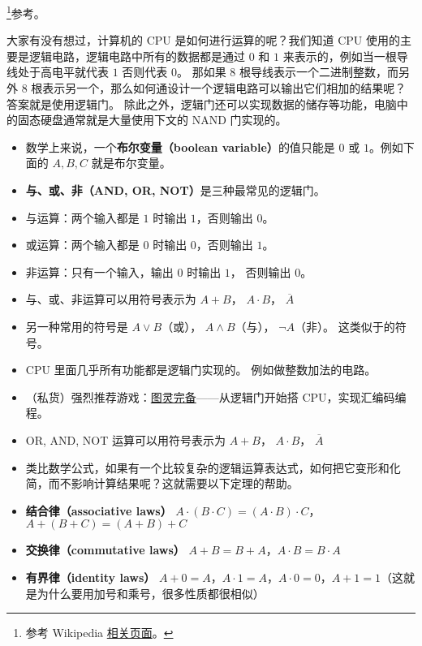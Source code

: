 
\begin{issues}
\issueDraft
\end{issues}

\footnote{参考 Wikipedia \href{https://en.wikipedia.org/wiki/Boolean_algebra}{相关页面}。}参考。

大家有没有想过，计算机的 CPU 是如何进行运算的呢？我们知道 CPU 使用的主要是逻辑电路，逻辑电路中所有的数据都是通过 $0$ 和 $1$ 来表示的，例如当一根导线处于高电平就代表 $1$ 否则代表 $0$。 那如果 8 根导线表示一个二进制整数，而另外 8 根表示另一个，那么如何通设计一个逻辑电路可以输出它们相加的结果呢？ 答案就是使用逻辑门。 除此之外，逻辑门还可以实现数据的储存等功能，电脑中的固态硬盘通常就是大量使用下文的 NAND 门实现的。

\begin{itemize}
\item 数学上来说，一个\textbf{布尔变量（boolean variable）}的值只能是 $0$ 或 $1$。例如下面的 $A,B,C$ 就是布尔变量。
\item \textbf{与、或、非（AND, OR, NOT）}是三种最常见的逻辑门。
\item 与运算：两个输入都是 $1$ 时输出 $1$，否则输出 $0$。
\item 或运算：两个输入都是 $0$ 时输出 $0$，否则输出 $1$。
\item 非运算：只有一个输入，输出 $0$ 时输出 $1$， 否则输出 $0$。
\item 与、或、非运算可以用符号表示为 $A + B$， $A\cdot B$， $\overline A$
\item 另一种常用的符号是 $A\lor B$（或）， $A\land B$（与）， $\neg A$（非）。 这类似于的符号。
\item CPU 里面几乎所有功能都是逻辑门实现的。 例如做整数加法的电路。
\item （私货）强烈推荐游戏：\href{https://turingcomplete.game/}{图灵完备}——从逻辑门开始搭 CPU，实现汇编码编程。
\item OR, AND, NOT 运算可以用符号表示为 $A + B$， $A\cdot B$， $\overline A$
\item 类比数学公式，如果有一个比较复杂的逻辑运算表达式，如何把它变形和化简，而不影响计算结果呢？这就需要以下定理的帮助。
\item \textbf{结合律（associative laws）} $A\cdot(B\cdot C) = (A\cdot B)\cdot C$， $A+(B+C)=(A+B)+C$
\item \textbf{交换律（commutative laws）} $A+B=B+A$，$A\cdot B=B\cdot A$
\item \textbf{有界律（identity laws）} $A+0=A$，$A\cdot 1=A$，$A\cdot 0 = 0$，$A+1=1$（这就是为什么要用加号和乘号，很多性质都很相似）

\end{itemize}
